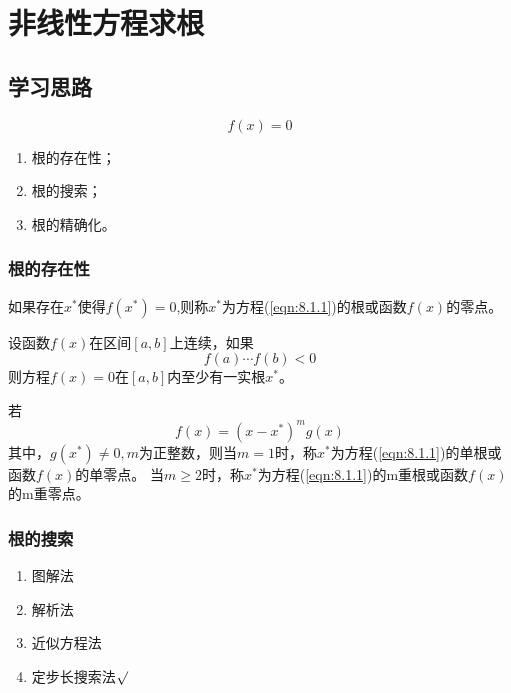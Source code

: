 \chapter{非线性方程求根}

\section*{学习思路}

\begin{equation}\label{eqn:8.1.1}
    f(x) = 0
\end{equation}

\begin{enumerate}
    \item 根的存在性；
    \item 根的搜索；
    \item 根的精确化。
\end{enumerate}

\subsection{根的存在性}

\begin{definition}
    如果存在$x^*$使得$f(x^*) = 0$,则称$x^*$为方程(\ref{eqn:8.1.1})的根或函数$f(x)$的零点。
\end{definition}

\begin{theorem}
    设函数$f(x)$在区间$[a,b]$上连续，如果
    \begin{equation*}
        f(a) \cdots f(b) < 0
    \end{equation*}
    则方程$f(x) = 0$在$[a,b]$内至少有一实根$x^*$。
\end{theorem}

\begin{definition}[m重根]
    若
    \begin{equation*}
        f(x) = (x-x^*)^mg(x)
    \end{equation*}
    其中，$g(x^*) \neq 0,m$为正整数，则当$m = 1$时，称$x^*$为方程(\ref{eqn:8.1.1})的单根或函数$f(x)$的单零点。
    当$m \geq 2$时，称$x^*$为方程(\ref{eqn:8.1.1})的m重根或函数$f(x)$的m重零点。
\end{definition}

\subsection{根的搜索}

\begin{enumerate}
    \item 图解法
    \item 解析法
    \item 近似方程法
    \item 定步长搜索法$\surd$ 
\end{enumerate}


